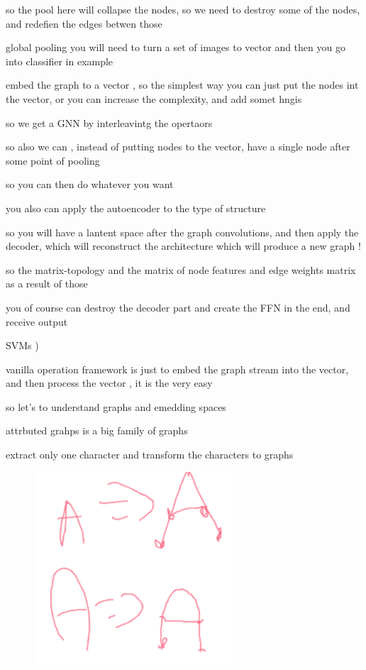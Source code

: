 \documentclass{article}
\begin{document}
so the pool here will collapse the nodes, so we need to destroy some of the nodes, and redefien the edges betwen those

global pooling you will need to turn a set of images to vector and then you go into classifier in example

embed the graph to a vector , so the simplest way you can just put the nodes int the vector, or you can increase the complexity, and add somet hngis

so we get a GNN by interleavintg the opertaors


so also we can , instead of putting nodes to the vector, have a single node after some point of pooling

so you can then do whatever you want 

you also can apply the autoencoder to the type of structure


so you will have a lantent space after the graph convolutions, and then apply the decoder, which will reconstruct the architecture which will produce a new graph !

so the matrix-topology and the matrix of node features and edge weights matrix as a result of those

you of course can destroy the decoder part and create the FFN in the end, and receive output



SVMs )

vanilla operation framework is just to embed the graph stream into the vector, and then process the vector , it is the very easy 

so let's to understand graphs and emedding spaces

attrbuted grahps is a big family of graphs


extract only one character and transform the characters to graphs


\begin{figure}
	\centering
	\includegraphics[width=0.7\linewidth]{"../imgs/digit images mapping"}
	\caption[digital images mapping]{}
	\label{fig:digit-images-mapping}
\end{figure}
\end{document}
